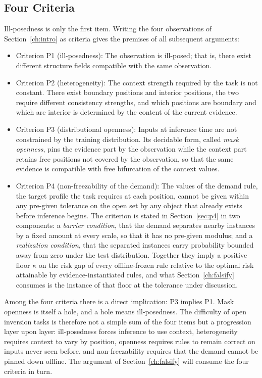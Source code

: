 \subsection{Four Criteria}

Ill-posedness is only the first item. Writing the four observations of Section~\ref{ch:intro} as criteria gives the premises of all subsequent arguments:

\begin{itemize}
\item Criterion P1 (ill-posedness): The observation is ill-posed; that is, there exist different structure fields compatible with the same observation.
\item Criterion P2 (heterogeneity): The context strength required by the task is not constant. There exist boundary positions and interior positions, the two require different consistency strengths, and which positions are boundary and which are interior is determined by the content of the current evidence.
\item Criterion P3 (distributional openness): Inputs at inference time are not constrained by the training distribution. Its decidable form, called \emph{mask openness}, pins the evidence part by the observation while the context part retains free positions not covered by the observation, so that the same evidence is compatible with free bifurcation of the context values.
\item Criterion P4 (non-freezability of the demand): The values of the demand rule, the target profile the task requires at each position, cannot be given within any pre-given tolerance on the open set by any object that already exists before inference begins. The criterion is stated in Section~\ref{sec:p4} in two components: a \emph{barrier condition}, that the demand separates nearby instances by a fixed amount at every scale, so that it has no pre-given modulus; and a \emph{realization condition}, that the separated instances carry probability bounded away from zero under the test distribution. Together they imply a positive floor $\kappa$ on the risk gap of every offline-frozen rule relative to the optimal risk attainable by evidence-instantiated rules, and what Section~\ref{ch:falsify} consumes is the instance of that floor at the tolerance under discussion.
\end{itemize}

Among the four criteria there is a direct implication: P3 implies P1. Mask openness is itself a hole, and a hole means ill-posedness. The difficulty of open inversion tasks is therefore not a simple sum of the four items but a progression layer upon layer: ill-posedness forces inference to use context, heterogeneity requires context to vary by position, openness requires rules to remain correct on inputs never seen before, and non-freezability requires that the demand cannot be pinned down offline. The argument of Section~\ref{ch:falsify} will consume the four criteria in turn.

